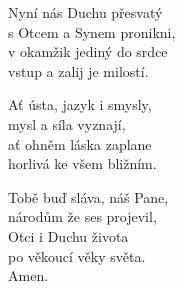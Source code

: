 \begin{translatioMulticol}{3}
Nyní nás Duchu přesvatý\\
s Otcem a Synem pronikni,\\
v okamžik jediný do srdce\\
vstup a zalij je milostí.\columnbreak

Ať ústa, jazyk i smysly,\\
mysl a síla vyznají,\\
ať ohněm láska zaplane\\
horlivá ke všem bližním.\columnbreak

Tobě buď sláva, náš Pane,\\
národům že ses projevil,\\
Otci i Duchu života\\
po věkoucí věky světa.\\
Amen.
\end{translatioMulticol}
